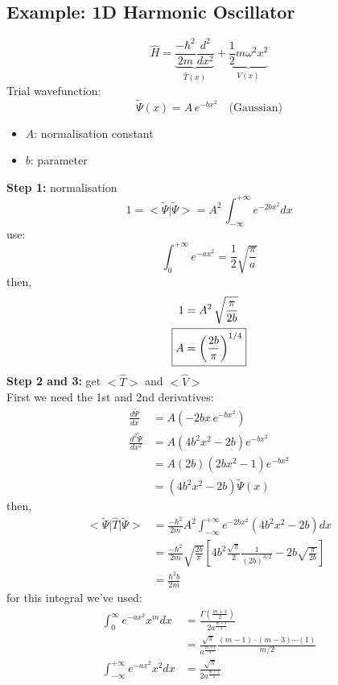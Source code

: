 \documentclass[12pt,fancychapters]{report}
\numberwithin{equation}{section}
\begin{document}
\subsection{Example: 1D Harmonic Oscillator}
\[
  \hat{H} = \underbrace{\frac{-\hbar^2}{2m}\frac{d^2}{dx^2}}_{\hat{T}(x)}+
  \underbrace{\frac{1}{2}m\omega^2x^2}_{V(x)}
\]
Trial wavefunction:
\[ \tilde{\Psi}(x) = A\,e^{-bx^2}\quad \text{(Gaussian)}  \]
\begin{itemize}
  \item $A$: normalisation constant
  \item $b$: parameter
\end{itemize}
\textbf{Step 1:} normalisation 
\[
  1 = \big<\tilde{\Psi}\big|\tilde{\Psi}\big> = A^2\,\int_{-\infty}^{+\infty} e^{-2bx^2}dx
\]
use: 
\begin{equation}
  \int_{0}^{+\infty} e^{-ax^2} = \frac{1}{2}\sqrt{\frac{\pi}{a}}
\end{equation}
then, 
\begin{align*}
  1 &= A^2\,\sqrt{\frac{\pi}{2b}}\\
  \Aboxed{ A &= \left(\frac{2b}{\pi}\right)^{1/4}}
\end{align*}
\textbf{Step 2 and 3: } get $\big<\hat{T}\big>$ and $\big<\hat{V}\big>$\\
First we need the 1st and 2nd derivatives: 
\begin{align*}
  \frac{d \tilde{\Psi}}{dx} &= A \left(-2bx\,e^{-bx^2}\right)\\
  \frac{d^2 \tilde{\Psi}}{dx^2} &= A\left(4b^2x^2-2b\right)e^{-bx^2}\\
                                &= A(2b)(2bx^2-1)e^{-bx^2}\\
                                &= (4b^2x^2-2b)\tilde{\Psi}(x)
\end{align*}
then, 
\begin{align*}
  \big<\tilde{\Psi}\big|\hat{T}\big|\tilde{\Psi}\big>&= \frac{-\hbar^2}{2m}A^2\int_{-\infty}
  ^{+\infty} e^{-2bx^2}(4b^2x^2-2b)dx\\
  &=\frac{-\hbar^2}{2m}\sqrt{\frac{2b}{\pi}}\left[4b^2\frac{\sqrt{\pi}}{2}\frac{1}{(2b)^{3/2}}
  -2b\sqrt{\frac{\pi}{2b}}\right]\\
  &= \frac{\hbar^2 b}{2m}
\end{align*}
for this integral we've used: 
\begin{equation}
  \begin{aligned}
    \int_{0}^{\infty}e^{-ax^2}x^m dx &= \frac{\Gamma\left(\frac{m+1}{2}\right)}
    {2a^{\frac{m+1}{2}}}\\
&= \frac{\sqrt{\pi}}{a^{\frac{m+1}{2}}}\frac{(m-1)\cdot(m-3)\cdots(1)}{m/2}\\
    \int_{-\infty}^{+\infty} e^{-ax^2}x^2dx &= \frac{\sqrt{\pi}}{2a^{\frac{m+1}{2}}}
  \end{aligned}
\end{equation}
\end{document}
